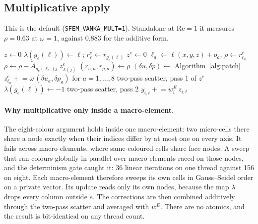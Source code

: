 \documentclass[11pt,a4paper]{article}
\newcommand{\code}[1]{\texttt{\small #1}}
\newcommand{\Rey}{\mathrm{Re}}
\begin{document}
\subsection{Multiplicative apply}

This is the default (\code{SFEM\_VANKA\_MULT=1}). Standalone at $\Rey = 1$ it measures
$\rho = 0.63$ at $\omega = 1$, against 0.883 for the additive form.

\begin{algorithm}[H]
\caption{Multiplicative Vanka, \code{vanka\_apply\_mult}}\label{alg:mult}
\begin{algorithmic}[1]
\State $z \gets 0$
 
    \State $\lambda(g_e(\ell)) \gets \ell$; \; $r^e_\ell \gets r_{g_e(\ell)}$
  \EndFor
  \State $z^e \gets 0$
   
       
        \State $\ell_a \gets \ell(x,y,z) + o_a$, \; $\rho \gets r^e_{\ell_a}$
            \State $\rho \gets \rho - \tilde A_{g_e(\ell_a) j}\; z^e_{\lambda(j)}$
          \EndIf {}
        \EndFor
        \State $(r_{u,a}, r_{p,a}) \gets \rho$
      \EndFor
      \State $(\delta u, \delta p) \gets$ Algorithm~\ref{alg:patch}
      \State $z^e_{\ell_a} \mathrel{+}= \omega\,(\delta u_a, \delta p_a)$ for $a = 1,\dots,8$
    \EndFor
  \EndFor
  \State two-pass scatter, pass 1 of $z^e$
    \State $\lambda(g_e(\ell)) \gets -1$ 
  \EndFor
\EndFor
\State two-pass scatter, pass 2
  \State $y_{i,t} \mathrel{+}= w^{E}_i\, z_{i,t}$
\EndFor
\end{algorithmic}
\end{algorithm}

\paragraph{Why multiplicative only inside a macro-element.} The eight-colour argument holds
inside one macro-element: two micro-cells there share a node exactly when their indices
differ by at most one on every axis. It fails across macro-elements, where same-coloured
cells share face nodes. A sweep that ran colours globally in parallel over macro-elements
raced on those nodes, and the determinism gate caught it: 36 linear iterations on one thread
against 156 on eight. Each macro-element therefore sweeps its own cells in Gauss--Seidel
order on a private vector. Its update reads only its own nodes, because the map $\lambda$
drops every column outside $e$. The corrections are then combined additively through the
two-pass scatter and averaged with $w^{E}$. There are no atomics, and the result is
bit-identical on any thread count.
\end{document}
